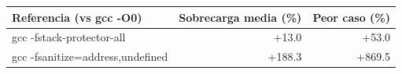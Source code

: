 \begin{tabular}{lrr}\toprule
Referencia (vs gcc -O0) & Sobrecarga media (\%) & Peor caso (\%) \\\midrule
gcc -fstack-protector-all & +13.0 & +53.0 \\
gcc -fsanitize=address,undefined & +188.3 & +869.5 \\
\bottomrule\end{tabular}
